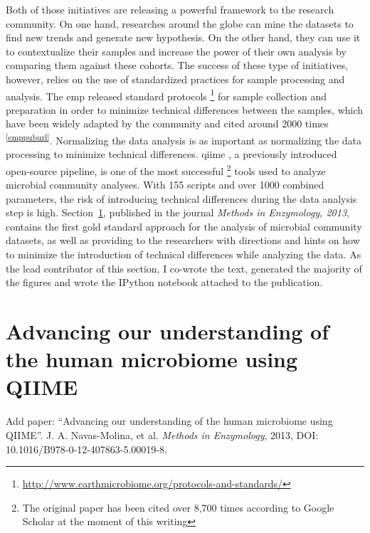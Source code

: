\documentclass[12pt,chapterheads]{ucsd}
\begin{document}
Both of those initiatives are releasing a powerful framework to the research
community. On one hand, researches around the globe can mine the datasets to
find new trends and generate new hypothesis. On the other hand, they can use
it to contextualize their samples and increase the power of their own analysis
by comparing them against these cohorts. The success of these type of initiatives,
however, relies on the use of standardized practices for sample processing and
analysis. The \gls{emp} released standard protocols
\footnote{ \url{http://www.earthmicrobiome.org/protocols-and-standards/}} for
sample collection and preparation in order to minimize technical differences
between the samples, which have been widely adapted by the community and cited
around 2000 times \textsuperscript{\ref{emppuburl}}. Normalizing the data
analysis is as important as normalizing the data processing to minimize
technical differences. \gls{qiime} \cite{Caporaso2010}, a previously introduced
open-source pipeline, is one of the most successful \footnote{The original paper
has been cited over 8,700 times according to Google Scholar at the moment of this writing}
tools used to analyze microbial community analyses. With 155 scripts and over 1000 combined
parameters, the risk of introducing technical differences during the data analysis
step is high. Section~\ref{section_book}, published in the journal
\textsl{Methods in Enzymology, 2013}, contains the first gold standard approach
for the analysis of microbial community datasets, as well as providing to the
researchers with directions and hints on how to minimize the introduction of
technical differences while analyzing the data. As the lead contributor of this
section, I co-wrote the text, generated the majority of the figures and wrote
the IPython notebook \cite{Perez2007} attached to the publication.


% 
\section{Advancing our understanding of the human microbiome using QIIME}\label{section_book}
Add paper: ``Advancing our understanding of the human microbiome using QIIME''. J. A. Navas-Molina, et al. \emph{Methods in Enzymology}, 2013, DOI: 10.1016/B978-0-12-407863-5.00019-8.



\end{document}
